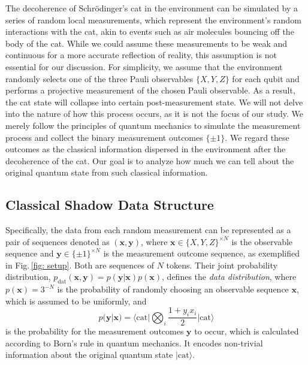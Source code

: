 \documentclass[fleqn,11pt]{wlscirep}
\newcommand{\bra}[1]{\langle #1|}
\newcommand{\ket}[1]{|#1 \rangle}
\newcommand{\vect}[1]{{\bm{#1}}}
\newcommand{\eq}[1]{\begin{equation}#1\end{equation}}
\newcommand{\figref}[1]{Fig.\,\ref{#1}}
\begin{document}
The decoherence of Schrödinger's cat in the environment can be simulated by a series of random local measurements, which represent the environment's random interactions with the cat, akin to events such as air molecules bouncing off the body of the cat. While we could assume these measurements to be weak and continuous for a more accurate reflection of reality, this assumption is not essential for our discussion. For simplicity, we assume that the environment randomly selects one of the three Pauli observables $\{X,Y,Z\}$ for each qubit and performs a projective measurement of the chosen Pauli observable. As a result, the cat state will collapse into certain post-measurement state. We will not delve into the nature of how this process occurs, as it is not the focus of our study. We merely follow the principles of quantum mechanics to simulate the measurement process and collect the binary measurement outcomes $\{\pm 1\}$. We regard these outcomes as the classical information dispersed in the environment after the decoherence of the cat. Our goal is to analyze how much we can tell about the original quantum state from such classical information.

\subsection*{Classical Shadow Data Structure}

Specifically, the data from each random measurement can be represented as a pair of sequences denoted as $(\vect{x},\vect{y})$, where $\vect{x}\in\{X,Y,Z\}^{\times N}$ is the observable sequence and $\vect{y}\in\{\pm1\}^{\times N}$ is the measurement outcome sequence, as exemplified in \figref{fig: setup}. Both are sequences of $N$ tokens. Their joint probability distribution, $p_\text{dat}(\vect{x},\vect{y})=p(\vect{y}|\vect{x})p(\vect{x})$, defines the \emph{data distribution}, where $p(\vect{x})=3^{-N}$ is the probability of randomly choosing an observable sequence $\vect{x}$, which is assumed to be uniformly, and
\eq{\label{eq: p(y|x) dat} 
p(\vect{y}|\vect{x})=\bra{\text{cat}}\bigotimes_i\frac{1+y_ix_i}{2}\ket{\text{cat}}} is the probability for the measurement outcomes $\vect{y}$ to occur, which is calculated according to Born's rule in quantum mechanics. It encodes non-trivial information about the original quantum state $\ket{\text{cat}}$.
\end{document}
